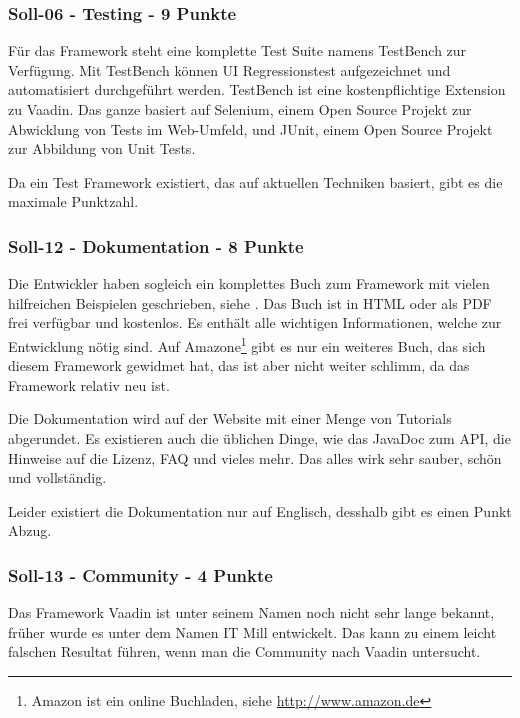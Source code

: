   \subsubsection{Soll-06 - Testing - 9 Punkte}
  
  Für das Framework steht eine komplette Test Suite namens TestBench zur
  Verfügung. Mit TestBench können UI Regressionstest aufgezeichnet und
  automatisiert durchgeführt werden. TestBench ist eine kostenpflichtige
  Extension zu Vaadin. Das ganze basiert auf Selenium, einem Open Source
  Projekt zur Abwicklung von Tests im Web-Umfeld, und JUnit, einem Open Source
  Projekt zur Abbildung von Unit Tests.
  
  Da ein Test Framework existiert, das auf aktuellen Techniken basiert, gibt es
  die maximale Punktzahl.
  
  \subsubsection{Soll-12 - Dokumentation - 8 Punkte}
  
  Die Entwickler haben sogleich ein komplettes Buch zum Framework mit vielen
  hilfreichen Beispielen geschrieben, siehe \cite{BookOfVaadin}. Das Buch ist
  in \ac{HTML} oder als \ac{PDF} frei verfügbar und kostenlos. Es enthält alle
  wichtigen Informationen, welche zur Entwicklung nötig sind. Auf
  Amazone\footnote{Amazon ist ein online Buchladen, siehe
  \url{http://www.amazon.de}} gibt es nur ein weiteres Buch, das sich diesem
  Framework gewidmet hat, das ist aber nicht weiter schlimm, da das Framework
  relativ neu ist.
  
  Die Dokumentation wird auf der Website mit einer Menge von Tutorials
  abgerundet. Es existieren auch die üblichen Dinge, wie das JavaDoc zum
  \ac{API}, die Hinweise auf die Lizenz, \ac{FAQ} und vieles mehr. Das alles
  wirk sehr sauber, schön und vollständig.
  
  Leider existiert die Dokumentation nur auf Englisch, desshalb gibt es einen
  Punkt Abzug.
  
  \subsubsection{Soll-13 - Community - 4 Punkte}
  
  Das Framework Vaadin ist unter seinem Namen noch nicht sehr lange bekannt,
  früher wurde es unter dem Namen IT Mill entwickelt. Das kann zu einem leicht
  falschen Resultat führen, wenn man die Community nach Vaadin untersucht.
  
